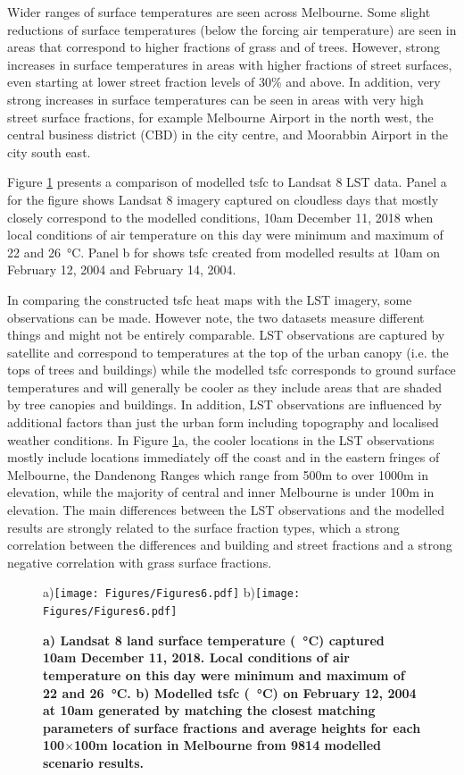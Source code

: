 \documentclass[final,3p,times,authoryear]{elsarticle}
\begin{document}
Wider ranges of surface temperatures are seen across Melbourne. Some slight reductions of surface temperatures (below the forcing air temperature) are seen in areas that correspond to higher fractions of grass and of trees. However, strong increases in surface temperatures in areas with higher fractions of street surfaces, even starting at lower street fraction levels of 30\% and above.  In addition, very strong increases in surface temperatures can be seen in areas with very high street surface fractions, for example Melbourne Airport in the north west, the central business district (CBD) in the city centre, and Moorabbin Airport in the city south east.

Figure \ref{fig:Melb_TSFC12_85} presents a comparison of modelled \gls{tsfc} to Landsat 8 LST data. Panel a for the figure shows Landsat 8 imagery captured on cloudless days that mostly closely correspond to the modelled conditions, 10am December 11, 2018 when local conditions of air temperature on this day were minimum and maximum of 22 and 26\SI{}{\degreeCelsius}. Panel b for shows \gls{tsfc} created from modelled results at 10am on February 12, 2004 and February 14, 2004. 

In comparing the constructed \gls{tsfc} heat maps with the LST imagery, some observations can be made. However note, the two datasets measure different things and might not be entirely comparable. LST observations are captured by satellite and correspond to temperatures at the top of the urban canopy (i.e. the tops of trees and buildings) while the modelled \gls{tsfc} corresponds to ground surface temperatures and will generally be cooler as they include areas that are shaded by tree canopies and buildings. In addition, LST observations are influenced by additional factors than just the urban form including topography and localised weather conditions. In Figure \ref{fig:Melb_TSFC12_85}a, the cooler locations in the LST observations mostly include locations immediately off the coast and in the eastern fringes of Melbourne, the Dandenong Ranges which range from 500m to over 1000m in elevation, while the majority of central and inner Melbourne is under 100m in elevation. The main differences between the LST observations and the modelled results are strongly related to the surface fraction types, which a strong correlation between the differences and building and street fractions and a strong negative correlation with grass surface fractions. 

\begin{figure}
\centering
a)\texttt{[image: Figures/Figures6.pdf]}
b)\texttt{[image: Figures/Figures6.pdf]}
\caption{\bf a) Landsat 8 land surface temperature (\SI{}{\degreeCelsius}) captured 10am December 11, 2018. Local conditions of air temperature on this day were minimum and maximum of 22 and 26\SI{}{\degreeCelsius}. b) Modelled \gls{tsfc} (\SI{}{\degreeCelsius}) on February 12, 2004 at 10am generated by matching the closest matching parameters of surface fractions and average heights for each 100$\times$100m location in Melbourne from 9814 modelled scenario results.}
 \label{fig:Melb_TSFC12_85}
\end{figure}
\end{document}
